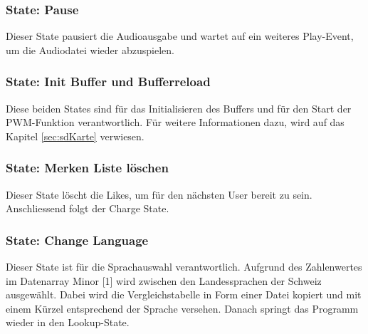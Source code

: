 \subsubsection*{State: Pause}

Dieser State pausiert die Audioausgabe und wartet auf ein weiteres Play-Event, um die Audiodatei wieder abzuspielen.

\subsubsection*{State: Init Buffer und Bufferreload}
Diese beiden States sind für das Initialisieren des Buffers und für den Start der PWM-Funktion verantwortlich. Für weitere Informationen dazu, wird auf das Kapitel \ref{sec:sdKarte} verwiesen.

\subsubsection*{State: Merken Liste löschen}

Dieser State löscht die Likes, um für den nächsten User bereit zu sein. Anschliessend folgt der Charge State.

\subsubsection*{State: Change Language}

Dieser State ist für die Sprachauswahl verantwortlich. Aufgrund des Zahlenwertes im Datenarray Minor [1] wird zwischen den Landessprachen der Schweiz ausgewählt. Dabei wird die Vergleichstabelle in Form einer Datei kopiert und mit einem Kürzel entsprechend der Sprache versehen. Danach springt das Programm wieder in den Lookup-State.

